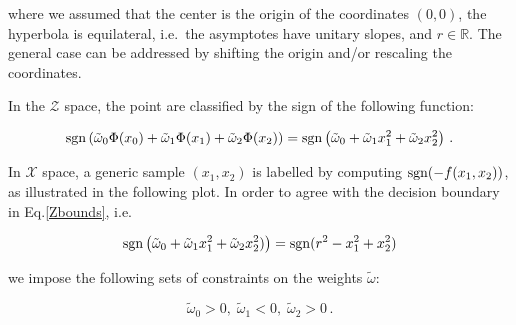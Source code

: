 \documentclass[11pt]{article}
\begin{document}
where we assumed that the center is the origin of the coordinates
\((0,0)\), the hyperbola is equilateral, i.e.~the asymptotes have
unitary slopes, and \(r\in \mathbb{R}\). The general case can be
addressed by shifting the origin and/or rescaling the coordinates.

In the \(\mathcal{Z}\) space, the point are classified by the sign of
the following function:

\begin{equation}
\label{Zbounds}
{\rm sgn}\left(\tilde{\omega}_0\Phi(x_0)+\tilde{\omega}_1 \Phi(x_1)+\tilde{\omega}_2 \Phi(x_2)\right)={\rm sgn}\left(\tilde{\omega}_0+\tilde{\omega}_1 x_1^2+\tilde{\omega}_2 x_2^2\right)\,.
\end{equation}

In \(\mathcal{X}\) space, a generic sample \((x_1,x_2)\) is labelled by
computing \({\rm sgn}{(-f(x_1,x_2))}\), as illustrated in the following
plot. In order to agree with the decision boundary in
Eq.\eqref{Zbounds}, i.e.

\begin{equation}
{\rm sgn}\left(\tilde{\omega}_0+\tilde{\omega}_1 x_1^2+\tilde{\omega}_2 x_2^2)\right)={\rm sgn}(r^2-x_1^2+x_2^2)
\end{equation}

we impose the following sets of constraints on the weights
\(\tilde{\omega}\):

\begin{equation}
\tilde{\omega}_0>0,\; \tilde{\omega}_1<0,\; \tilde{\omega}_2>0\,.
\end{equation}
\end{document}
